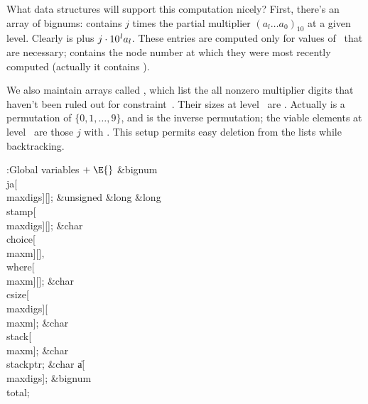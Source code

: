 What data structures will support this
computation nicely?
First, there's an array
of bignums:  contains $j$ times the partial multiplier
$(a_l\ldots a_0)_{10}$ at a given level. Clearly
 is  plus $j\cdot10^{%
\mkern1mul}a_l$. These entries
are computed only for values of~ that are necessary;
 contains the node number at which they were
most recently computed (actually it contains ).

We also maintain arrays called , which list the all nonzero
multiplier digits that haven't been ruled out for constraint~.
Their sizes at level~ are .
Actually  is a permutation of $\{0,1,\ldots,9\}$, and
 is the inverse permutation; the viable elements at
level~ are those $j$ with .
This setup permits easy deletion from the lists while backtracking.

\Y\B\4:Global variables\X${}\mathrel+\E{}$\6
\&{bignum} \\{ja}[\\{maxdigs}][];\6
\&{unsigned} \&{long} \&{long} \\{stamp}[\\{maxdigs}][];\6
\&{char} \\{choice}[\\{maxm}][]${},{}$ \\{where}[\\{maxm}][];\6
\&{char} \\{csize}[\\{maxdigs}][\\{maxm}];\6
\&{char} \\{stack}[\\{maxm}];\6
\&{char} \\{stackptr};\6
\&{char} \|a[\\{maxdigs}];\6
\&{bignum} \\{total};\par
\fi


